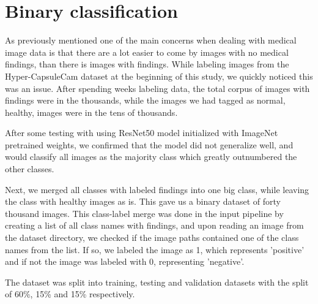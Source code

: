 \documentclass[thesis.tex]{subfiles}
\begin{document}
\section{Binary classification} \label{sec:system_implementation}
As previously mentioned one of the main concerns when dealing with medical image data is that there are a lot easier to come by images with no medical findings, than there is images with findings. While labeling images from the Hyper-CapsuleCam dataset at the beginning of this study, we quickly noticed this was an issue. After spending weeks labeling data, the total corpus of images with findings were in the thousands, while the images we had tagged as normal, healthy, images were in the tens of thousands. 

After some testing with using ResNet50 model initialized with ImageNet pretrained weights, we confirmed that the model did not generalize well, and would classify all images as the majority class which greatly outnumbered the other classes. 

Next, we merged all classes with labeled findings into one big class, while leaving the class with healthy images as is. This gave us a binary dataset of forty thousand images. This class-label merge was done in the input pipeline by creating a list of all class names with findings, and upon reading an image from the dataset directory, we checked if the image paths contained one of the class names from the list. If so, we labeled the image as 1, which represents 'positive' and if not the image was labeled with 0, representing 'negative'.

The dataset was split into training, testing and validation datasets with the split of 60\%, 15\% and 15\% respectively.
\end{document}
